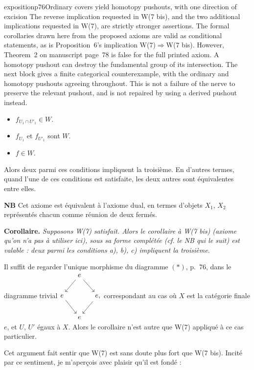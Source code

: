 \begin{description}[leftmargin=5em, style=sameline]
\begin{dcomment}{exposition}{p76}{Ordinary covers yield homotopy pushouts, with one direction of excision}
The reverse implication requested in W(7 bis), and the two additional implications requested in W(7), are strictly stronger assertions. The formal corollaries drawn here from the proposed axioms are valid as conditional statements, as is Proposition~6's implication W(7)$\Rightarrow$W(7 bis). However, Theorem~2 on manuscript page~78 is false for the full printed axiom. A homotopy pushout can destroy the fundamental group of its intersection. The next block gives a finite categorical counterexample, with the ordinary and homotopy pushouts agreeing throughout. This is not a failure of the nerve to preserve the relevant pushout, and is not repaired by using a derived pushout instead.
\end{dcomment}


\begin{itemize}
\item[a)] $f_{U_1\cap U'_1}\in W$.
\item[b)] $f_{U_1}$ et $f_{U'_1}$ sont $W$.
\item[c)] $f\in W$.
\end{itemize}

Alors deux parmi ces conditions impliquent la troisième. En d'autres termes, quand l'une de ces conditions est satisfaite, les deux autres sont équivalentes entre elles.
\end{description}

\textbf{NB} Cet axiome est équivalent à l'axiome dual, en termes d'objets $X_1$, $X_2$ représentés chacun comme réunion de deux fermés.

\textbf{Corollaire.} \textit{Supposons \textup{W(7)} satisfait. Alors le corollaire à \textup{W(7 bis)} (axiome qu'on n'a pas à utiliser ici), sous sa forme complétée (cf. le NB qui le suit) est valable : deux parmi les conditions a), b), c) impliquent la troisième.}

Il suffit de regarder l'unique morphisme du diagramme $(*)$, p.~76, dans le diagramme trivial\quad $\vcenter{\hbox{\begin{tikzcd}[column sep=small]
& e \arrow[dl] \arrow[dr] & \\
e \arrow[dr] & & e, \arrow[dl] \\
& e &
\end{tikzcd}}}$\quad correspondant au cas où $X$ est la catégorie finale $e$, et $U$, $U'$ égaux à $X$. Alors le corollaire n'est autre que W(7) appliqué à ce cas particulier.

Cet argument fait sentir que W(7) est sans doute plus fort que W(7 bis). Incité par ce sentiment, je m'aperçois avec plaisir qu'il est fondé :

